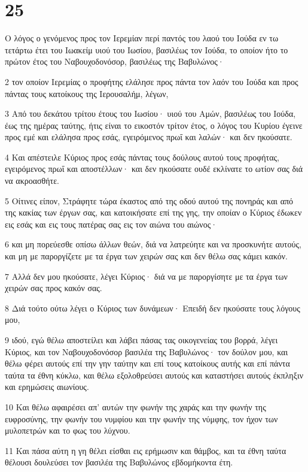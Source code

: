 \chapter{25}

\par Ο λόγος ο γενόμενος προς τον Ιερεμίαν περί παντός του λαού του Ιούδα εν τω τετάρτω έτει του Ιωακείμ υιού του Ιωσίου, βασιλέως τον Ιούδα, το οποίον ήτο το πρώτον έτος του Ναβουχοδονόσορ, βασιλέως της Βαβυλώνος·
\par 2 τον οποίον Ιερεμίας ο προφήτης ελάλησε προς πάντα τον λαόν του Ιούδα και προς πάντας τους κατοίκους της Ιερουσαλήμ, λέγων,
\par 3 Από του δεκάτου τρίτου έτους του Ιωσίου· υιού του Αμών, βασιλέως του Ιούδα, έως της ημέρας ταύτης, ήτις είναι το εικοστόν τρίτον έτος, ο λόγος του Κυρίου έγεινε προς εμέ και ελάλησα προς εσάς, εγειρόμενος πρωΐ και λαλών· και δεν ηκούσατε.
\par 4 Και απέστειλε Κύριος προς εσάς πάντας τους δούλους αυτού τους προφήτας, εγειρόμενος πρωΐ και αποστέλλων· και δεν ηκούσατε ουδέ εκλίνατε το ωτίον σας διά να ακροασθήτε.
\par 5 Οίτινες είπον, Στράφητε τώρα έκαστος από της οδού αυτού της πονηράς και από της κακίας των έργων σας, και κατοικήσατε επί της γης, την οποίαν ο Κύριος έδωκεν εις εσάς και εις τους πατέρας σας εις τον αιώνα του αιώνος·
\par 6 και μη πορεύεσθε οπίσω άλλων θεών, διά να λατρεύητε και να προσκυνήτε αυτούς, και μη με παροργίζετε με τα έργα των χειρών σας και δεν θέλω σας κάμει κακόν.
\par 7 Αλλά δεν μου ηκούσατε, λέγει Κύριος· διά να με παροργίσητε με τα έργα των χειρών σας προς κακόν σας.
\par 8 Διά τούτο ούτω λέγει ο Κύριος των δυνάμεων· Επειδή δεν ηκούσατε τους λόγους μου,
\par 9 ιδού, εγώ θέλω αποστείλει και λάβει πάσας τας οικογενείας του βορρά, λέγει Κύριος, και τον Ναβουχοδονόσορ βασιλέα της Βαβυλώνος· τον δούλον μου, και θέλω φέρει αυτούς επί την γην ταύτην και επί τους κατοίκους αυτής και επί πάντα ταύτα τα έθνη κύκλω, και θέλω εξολοθρεύσει αυτούς και καταστήσει αυτούς έκπληξιν και ερημώσεις αιωνίους.
\par 10 Και θέλω αφαιρέσει απ' αυτών την φωνήν της χαράς και την φωνήν της ευφροσύνης, την φωνήν του νυμφίου και την φωνήν της νύμφης, τον ήχον των μυλοπετρών και το φως του λύχνου.
\par 11 Και πάσα αύτη η γη θέλει είσθαι εις ερήμωσιν και θάμβος, και τα έθνη ταύτα θέλουσι δουλεύσει τον βασιλέα της Βαβυλώνος εβδομήκοντα έτη.

